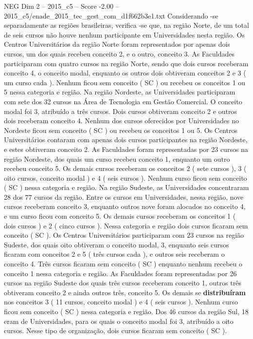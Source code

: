 \begin{textsample}{NEG Dim 2 – 2015\_c5 – Score -2.00 – 2015\_c5/enade\_2015\_tec\_gest\_com\_d1f662b3e1.txt}
Considerando -se separadamente as regiões brasileiras, verifica -se que, na região Norte, de um total de seis cursos não houve nenhum participante em Universidades nesta região.
Os Centros Universitários da região Norte foram representados por apenas dois cursos, um dos quais recebeu conceito 2, e o outro, conceito 3.
As Faculdades participaram com quatro cursos na região Norte, sendo que dois cursos receberam conceito 4, o conceito modal, enquanto os outros dois obtiveram conceitos 2 e 3 ( um curso cada ).
Nenhum ficou sem conceito ( SC ) ou recebeu os conceitos 1 ou 5 nessa categoria e região.
Na região Nordeste, as Universidades participaram com sete dos 32 cursos na Área de Tecnologia em Gestão Comercial.
O conceito modal foi 3, atribuído a três cursos.
Dois cursos obtiveram conceito 2 e outros dois receberam conceito 4.
Nenhum dos cursos oferecidos por Universidades no Nordeste ficou sem conceito ( SC ) ou recebeu os conceitos 1 ou 5.
Os Centros Universitários contaram com apenas dois cursos participantes na região Nordeste, e estes obtiveram conceito 2.
As Faculdades foram representadas por 23 cursos na região Nordeste, dos quais um curso recebeu conceito 1, enquanto um outro recebeu conceito 5.
Os demais cursos receberam os conceitos 2 ( sete cursos ), 3 ( oito cursos, conceito modal ) e 4 ( seis cursos ).
Nenhum curso ficou sem conceito ( SC ) nessa categoria e região.
Na região Sudeste, as Universidades concentraram 28 dos 77 cursos da região.
Entre os cursos em Universidades, nessa região, nove cursos receberam conceito 3, enquanto outros nove foram alocados no conceito 4, e um curso ficou com conceito 5.
Os demais cursos receberam os conceitos 1 ( dois cursos ) e 2 ( cinco cursos ).
Nessa categoria e região dois cursos ficaram sem conceito ( SC ).
Os Centros Universitários participaram com 23 cursos na região Sudeste, dos quais oito obtiveram o conceito modal, 3, enquanto seis cursos ficaram com conceitos 2 e 5 ( três cursos cada ), e outros seis receberam o conceito 4.
Três cursos ficaram sem conceito ( SC ) enquanto nenhum recebeu o conceito 1 nessa categoria e região.
As Faculdades foram representadas por 26 cursos na região Sudeste dos quais três cursos receberam conceito 1, outros três obtiveram conceito 2 e ainda outros três, conceito 5.
Os demais se \textbf{distribuíram} nos conceitos 3 ( 11 cursos, conceito modal ) e 4 ( seis cursos ).
Nenhum curso ficou sem conceito ( SC ) nessa categoria e região.
Dos 46 cursos da região Sul, 18 eram de Universidades, para os quais o conceito modal foi 3, atribuído a oito cursos.
Nesse tipo de organização, dois cursos ficaram sem conceito ( SC ).

\end{textsample}
